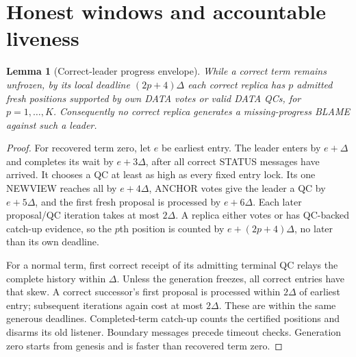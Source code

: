 \documentclass[11pt,a4paper]{article}
\newtheorem{lemma}[lemma]{Lemma}
\begin{document}
\section{Honest windows and accountable liveness}
\label{sec:liveness}
\begin{lemma}[Correct-leader progress envelope]
\label{lem:progress}
While a correct term remains unfrozen, by its local deadline
$(2p+4)\Delta$ each correct replica has $p$ admitted fresh positions
supported by own DATA votes or valid DATA QCs, for $p=1,\ldots,K$.
Consequently no correct replica generates a missing-progress BLAME
against such a leader.
\end{lemma}
\begin{proof}
For recovered term zero, let $e$ be earliest entry. The leader enters
by $e+\Delta$ and completes its wait by $e+3\Delta$, after all correct
STATUS messages have arrived. It chooses a QC at least as high as every
fixed entry lock. Its one NEWVIEW reaches all by $e+4\Delta$,
ANCHOR votes give the leader a QC by $e+5\Delta$, and the first fresh
proposal is processed by $e+6\Delta$. Each later proposal/QC iteration
takes at most $2\Delta$. A replica either votes or has QC-backed
catch-up evidence, so the $p$th position is counted by
$e+(2p+4)\Delta$, no later than its own deadline.

For a normal term, first correct receipt of its admitting terminal QC
relays the complete history within $\Delta$. Unless the generation freezes,
all correct entries have that skew. A correct successor's first proposal
is processed within $2\Delta$ of earliest entry; subsequent iterations
again cost at most $2\Delta$. These are within the same generous deadlines.
Completed-term catch-up counts the certified positions and disarms its
old listener. Boundary messages precede timeout checks. Generation zero
starts from genesis and is faster than recovered term zero.
\end{proof}
\end{document}
